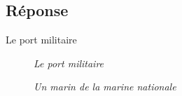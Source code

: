 \documentclass[12pt, report]{article}
\begin{document}
\subsection*{Réponse}
Le port militaire
\begin{center}
\begin{figure}[ht]
\caption{\textit{Le port militaire}}
\end{figure}
\end{center}
\begin{center}
\begin{figure}[ht]
\caption{\textit{Un marin de la marine nationale}}
\end{figure}
\end{center}
\end{document}
